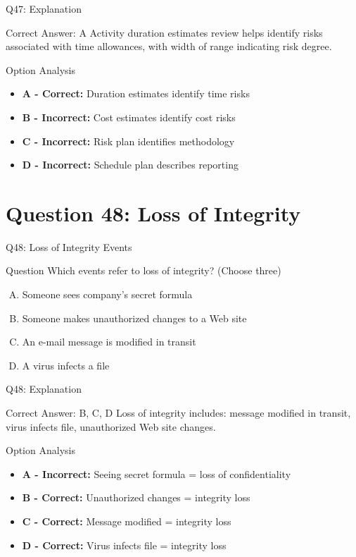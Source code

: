 \documentclass{beamer}
\begin{document}
	\begin{frame}{Q47: Explanation}
		\begin{block}{Correct Answer: A}
			Activity duration estimates review helps identify risks associated with time allowances, with width of range indicating risk degree.
		\end{block}
		\begin{block}{Option Analysis}
			\begin{itemize}
				\item \textbf{A - Correct:} Duration estimates identify time risks
				\item \textbf{B - Incorrect:} Cost estimates identify cost risks
				\item \textbf{C - Incorrect:} Risk plan identifies methodology
				\item \textbf{D - Incorrect:} Schedule plan describes reporting
			\end{itemize}
		\end{block}
	\end{frame}
	
	\section{Question 48: Loss of Integrity}
	
	\begin{frame}{Q48: Loss of Integrity Events}
		\begin{block}{Question}
			Which events refer to loss of integrity? (Choose three)
		\end{block}
		\begin{enumerate}[(A)]
			\item Someone sees company's secret formula
			\item Someone makes unauthorized changes to a Web site
			\item An e-mail message is modified in transit
			\item A virus infects a file
		\end{enumerate}
	\end{frame}
	
	\begin{frame}{Q48: Explanation}
		\begin{block}{Correct Answer: B, C, D}
			Loss of integrity includes: message modified in transit, virus infects file, unauthorized Web site changes.
		\end{block}
		\begin{block}{Option Analysis}
			\begin{itemize}
				\item \textbf{A - Incorrect:} Seeing secret formula = loss of confidentiality
				\item \textbf{B - Correct:} Unauthorized changes = integrity loss
				\item \textbf{C - Correct:} Message modified = integrity loss
				\item \textbf{D - Correct:} Virus infects file = integrity loss
			\end{itemize}
		\end{block}
	\end{frame}
	
\end{document}
